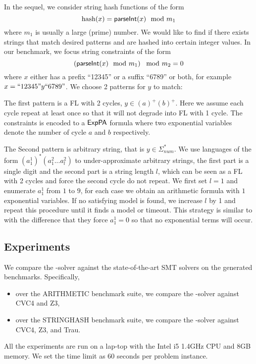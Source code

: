 {%

In the sequel, we consider string hash functions of the form  
\begin{equation}
    \text{hash}(x)= \textsf{parseInt}(x) \mod m_1  \notag
\end{equation}
where $m_1$ is usually a large (prime) number. We would like to find if there exists strings that match desired patterns and are hashed into certain integer values. In our benchmark, we focus string constraints of the form
\begin{equation}
    \left( \textsf{parseInt}(x) \mod m_1\right) \mod m_2 = 0   \notag
\end{equation}
where $x$ either has a prefix ``12345'' or a suffix ``6789'' or both, for example $x=``12345"y``6789"$. We choose 2 patterns for $y$ to match: 

The first pattern is a FL with 2 cycles, $y \in (a)^+(b)^+$. Here we assume each cycle repeat at least once so that it will not degrade into FL with 1 cycle. The constraints is encoded to a ${\sf ExpPA}$ formula where two exponential variables denote the number of cycle $a$ and $b$ respectively.

The Second pattern is arbitrary string, that is $y\in \Sigma_{num}^*$. We use languages of the form $(a^1_1)^* (a^2_1...a^2_l)$ to under-approximate arbitrary strings, the first part is a single digit and the second part is a string length $l$, which can be seen as a FL with 2 cycles and force the second cycle do not repeat. We first set $l=1$ and enumerate $a^1_1$ from $1$ to $9$, for each case we obtain an arithmetic formula with $1$ exponential variables. If no satisfying model is found, we increase $l$ by 1 and repeat this procedure until it finds a model or timeout. This strategy is similar to \cite{Abdulla2020} with the difference that they force $a^1_1=0$ so that no exponential terms will occur.
}

\vspace*{-2mm}
\subsection{Experiments}

We compare the {\paexp}-solver against the state-of-the-art SMT solvers on the generated benchmarks. Specifically, 
\begin{itemize}
\item over the ARITHMETIC benchmark suite, we compare the {\paexp}-solver against CVC4 and Z3,
\item over the STRINGHASH benchmark suite, we compare the {\paexp}-solver against CVC4, Z3, and Trau. 
\end{itemize}
All the experiments are run on a lap-top with the Intel i5 1.4GHz CPU and 8GB memory. We set the time limit as 60 seconds per problem instance. 

